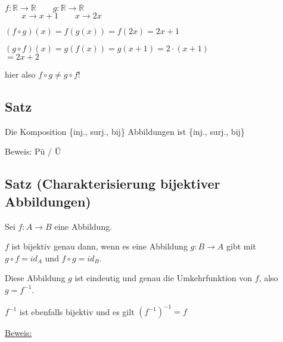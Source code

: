 \documentclass[a4paper, 12pt, twoside] {article}
\begin{document}
$f \colon \mathbb{R} \rightarrow \mathbb{R} \qquad g \colon \mathbb{R} \rightarrow \mathbb{R}$ \\
$\qquad x \rightarrow x + 1 \qquad x \rightarrow 2x$

$(f \circ g) (x) = f(g(x)) = f(2x) = 2x+1$

$(g \circ f) (x) = g(f(x)) = g(x+1) = 2 \cdot (x+1)$ \\
$= 2x +2$

hier also $f \circ g \neq g \circ f$!

\subsection[Satz (Eigenschaften der Komposition)]{Satz} %
Die Komposition \{inj., surj., bij\} Abbildungen ist \{inj., surj., bij\}

Beweis: Pü / Ü

\subsection{Satz (Charakterisierung bijektiver Abbildungen)} %

Sei $f \colon A \rightarrow B$ eine Abbildung.

$f$ ist bijektiv genau dann, wenn es eine Abbildung
$g \colon B \rightarrow A$ gibt mit \\
$g \circ f = id_{A}$ und  $f \circ g = id_{B}$.

Diese Abbildung $g$ ist eindeutig und genau die Umkehrfunktion von $f$, also \\
$g = f^{-1}$.

$f^{-1}$ ist ebenfalls bijektiv und es gilt $(f^{-1})^{-1} = f$

\underline{Beweis: }
\end{document}
